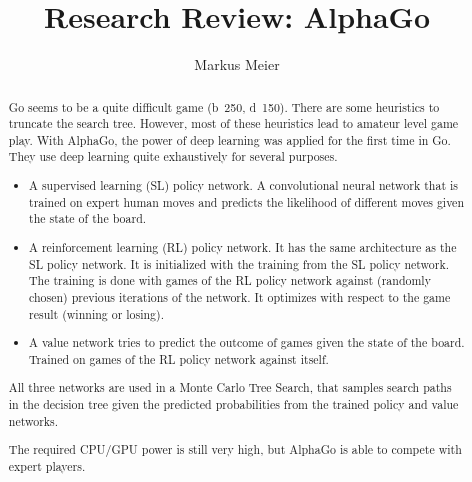 \documentclass[10pt,a4paper]{article}
\author{Markus Meier}
\title{Research Review: AlphaGo}
\begin{document}
\maketitle

\begin{abstract}
Go seems to be a quite difficult game (b~250, d~150). There are some heuristics to truncate the search tree. However, most of these heuristics lead to amateur level game play.
With AlphaGo, the power of deep learning was applied for the first time in Go. They use deep learning quite exhaustively for several purposes.

\begin{itemize}
\item A supervised learning (SL) policy network. A convolutional neural network that is trained on expert human moves and predicts the likelihood of different moves given the state of the board.
\item A reinforcement learning (RL) policy network. It has the same architecture as the SL policy network. It is initialized with the training from the SL policy network. The training is done with games of the RL policy network against (randomly chosen) previous iterations of the network. It optimizes with respect to the game result (winning or losing).
\item A value network tries to predict the outcome of games given the state of the board. Trained on games of the RL policy network against itself.
\end{itemize}

All three networks are used in a Monte Carlo Tree Search, that samples search paths in the decision tree given the predicted probabilities from the trained policy and value networks.

The required CPU/GPU power is still very high, but AlphaGo is able to compete with expert players.

\end{abstract}
\end{document}
